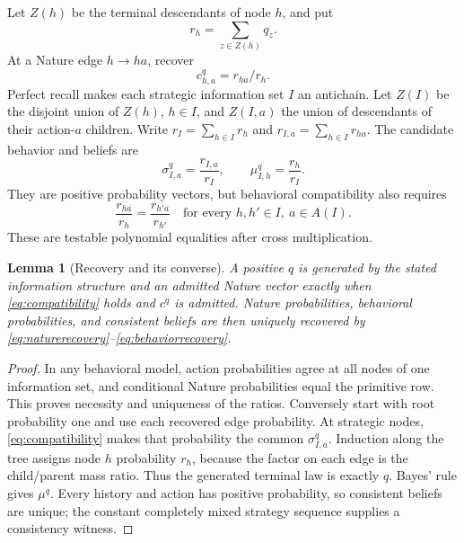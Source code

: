 \documentclass[11pt,a4paper]{article}
\numberwithin{equation}{section}
\newtheorem{lemma}[theorem]{Lemma}
\theoremstyle{definition}
\begin{document}
Let \(Z(h)\) be the terminal descendants of node \(h\), and put
\[
 r_h=\sum_{z\in Z(h)}q_z.
\]
At a Nature edge \(h\to ha\), recover
\begin{equation}\label{eq:naturerecovery}
 c^q_{h,a}=r_{ha}/r_h.
\end{equation}
Perfect recall makes each strategic information set \(I\) an antichain.
Let \(Z(I)\) be the disjoint union of \(Z(h)\), \(h\in I\), and
\(Z(I,a)\) the union of descendants of their action-\(a\) children.
Write \(r_I=\sum_{h\in I}r_h\) and \(r_{I,a}=\sum_{h\in I}r_{ha}\).
The candidate behavior and beliefs are
\begin{equation}\label{eq:behaviorrecovery}
 \sigma^q_{I,a}=\frac{r_{I,a}}{r_I},\qquad
 \mu^q_{I,h}=\frac{r_h}{r_I}.
\end{equation}
They are positive probability vectors, but behavioral compatibility
also requires
\begin{equation}\label{eq:compatibility}
 \frac{r_{ha}}{r_h}=\frac{r_{h'a}}{r_{h'}}
 \quad\text{for every }h,h'\in I,\ a\in A(I).
\end{equation}
These are testable polynomial equalities after cross multiplication.

\begin{lemma}[Recovery and its converse]\label{lem:recovery}
A positive \(q\) is generated by the stated information structure
and an admitted Nature vector exactly when \eqref{eq:compatibility}
holds and \(c^q\) is admitted. Nature probabilities, behavioral
probabilities, and consistent beliefs are then uniquely recovered
by \eqref{eq:naturerecovery}--\eqref{eq:behaviorrecovery}.
\end{lemma}
\begin{proof}
In any behavioral model, action probabilities agree at all nodes of
one information set, and conditional Nature probabilities equal the
primitive row. This proves necessity and uniqueness of the ratios.
Conversely start with root probability one and use each recovered
edge probability. At strategic nodes, \eqref{eq:compatibility}
makes that probability the common \(\sigma^q_{I,a}\).
Induction along the tree assigns node \(h\) probability \(r_h\),
because the factor on each edge is the child/parent mass ratio.
Thus the generated terminal law is exactly \(q\).
Bayes' rule gives \(\mu^q\). Every history and action has positive
probability, so consistent beliefs are unique; the constant completely
mixed strategy sequence supplies a consistency witness.
\end{proof}
\end{document}

